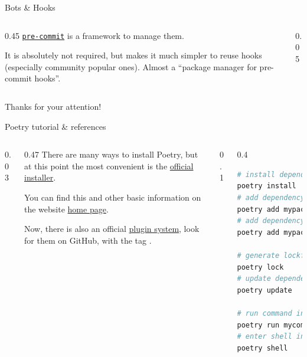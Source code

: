 \documentclass[9pt]{beamer}
\begin{document}
\begin{frame}{Bots \& Hooks}
\begin{columns}
\begin{column}{0.45\textwidth}
            \href{https://pre-commit.com/}{\texttt{pre-commit}} is a framework
            to manage them.
            \vspace*{10pt}

            It is absolutely not required, but makes it much simpler to reuse
            hooks (especially community popular ones).
            Almost a \enquote{package manager for pre-commit hooks}.
            \vspace*{15pt}
        \end{column}
        \begin{column}{0.05\textwidth}
        \end{column}
    \end{columns}
\end{frame}

\begin{frame}[standout]
    Thanks for your attention!
\end{frame}

\appendix

\begin{frame}[fragile]{Poetry tutorial \& references}
    \begin{columns}
        \begin{column}{0.03\textwidth}
        \end{column}
        \begin{column}{0.47\textwidth}
            There are many ways to install Poetry, but at this point the most
            convenient is the
            \href{https://python-poetry.org/docs/#installation}{official
            installer}.\newline

            You can find this and other basic information on the website
            \href{https://python-poetry.org/}{home page}.\newline

            Now, there is also an official
            \href{https://python-poetry.org/docs/plugins/}{plugin system}, look
            for them on GitHub, with the tag
            \href{https://github.com/topics/poetry-plugin}{}.
        \end{column}
        \begin{column}{0.1\textwidth}
        \end{column}
        \begin{column}{0.4\textwidth}
            \begin{lstlisting}[language=bash,style=mystyle]
# install dependencies
poetry install
# add dependency
poetry add mypackage
# add dependency to given group
poetry add mypackage -G mygroup

# generate lockfile
poetry lock
# update dependencies
poetry update

# run command in environment
poetry run mycommand
# enter shell inside environment
poetry shell\end{lstlisting}
        \end{column}
    \end{columns}
\end{frame}
\end{document}
